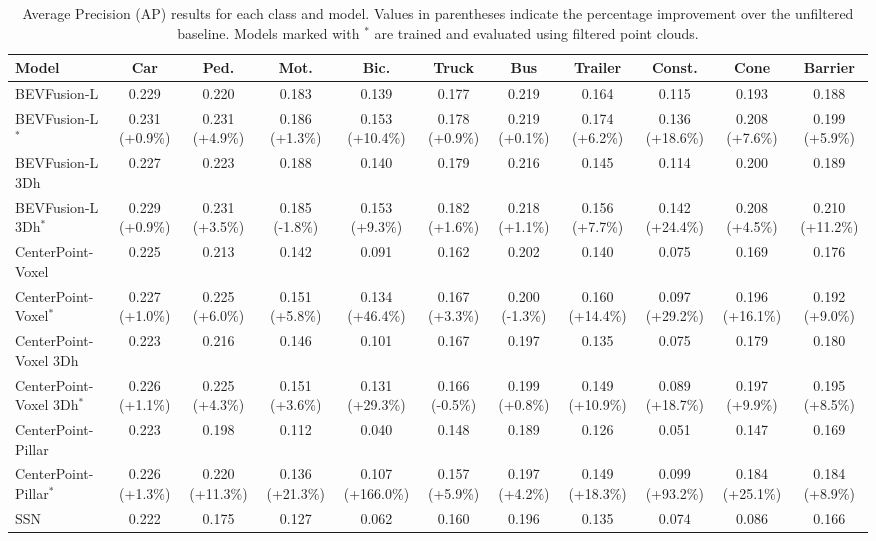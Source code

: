 
\begin{table}[htpb]
    \caption{Average Precision (AP) results for each class and model. Values in parentheses indicate the percentage improvement over the unfiltered baseline. Models marked with $^*$ are trained and evaluated using filtered point clouds.}
    \centering
    \begin{tabular}{lcccccccccc}
    \midrule
    Model & Car & Ped. & Mot. & Bic. & Truck & Bus & Trailer & Const. & Cone & Barrier \\
    \midrule
    BEVFusion-L & 0.229 & 0.220 & 0.183 & 0.139 & 0.177 & 0.219 & 0.164 & 0.115 & 0.193 & 0.188 \\
    BEVFusion-L$^*$ & 0.231 (+0.9\%) & 0.231 (+4.9\%) & 0.186 (+1.3\%) & 0.153 (+10.4\%) & 0.178 (+0.9\%) & 0.219 (+0.1\%) & 0.174 (+6.2\%) & 0.136 (+18.6\%) & 0.208 (+7.6\%) & 0.199 (+5.9\%) \\
    \midrule
    BEVFusion-L 3Dh & 0.227 & 0.223 & 0.188 & 0.140 & 0.179 & 0.216 & 0.145 & 0.114 & 0.200 & 0.189 \\
    BEVFusion-L 3Dh$^*$ & 0.229 (+0.9\%) & 0.231 (+3.5\%) & 0.185 (-1.8\%) & 0.153 (+9.3\%) & 0.182 (+1.6\%) & 0.218 (+1.1\%) & 0.156 (+7.7\%) & 0.142 (+24.4\%) & 0.208 (+4.5\%) & 0.210 (+11.2\%) \\
    \midrule
    CenterPoint-Voxel & 0.225 & 0.213 & 0.142 & 0.091 & 0.162 & 0.202 & 0.140 & 0.075 & 0.169 & 0.176 \\
    CenterPoint-Voxel$^*$ & 0.227 (+1.0\%) & 0.225 (+6.0\%) & 0.151 (+5.8\%) & 0.134 (+46.4\%) & 0.167 (+3.3\%) & 0.200 (-1.3\%) & 0.160 (+14.4\%) & 0.097 (+29.2\%) & 0.196 (+16.1\%) & 0.192 (+9.0\%) \\
    \midrule
    CenterPoint-Voxel 3Dh & 0.223 & 0.216 & 0.146 & 0.101 & 0.167 & 0.197 & 0.135 & 0.075 & 0.179 & 0.180 \\
    CenterPoint-Voxel 3Dh$^*$ & 0.226 (+1.1\%) & 0.225 (+4.3\%) & 0.151 (+3.6\%) & 0.131 (+29.3\%) & 0.166 (-0.5\%) & 0.199 (+0.8\%) & 0.149 (+10.9\%) & 0.089 (+18.7\%) & 0.197 (+9.9\%) & 0.195 (+8.5\%) \\
    \midrule
    CenterPoint-Pillar & 0.223 & 0.198 & 0.112 & 0.040 & 0.148 & 0.189 & 0.126 & 0.051 & 0.147 & 0.169 \\
    CenterPoint-Pillar$^*$ & 0.226 (+1.3\%) & 0.220 (+11.3\%) & 0.136 (+21.3\%) & 0.107 (+166.0\%) & 0.157 (+5.9\%) & 0.197 (+4.2\%) & 0.149 (+18.3\%) & 0.099 (+93.2\%) & 0.184 (+25.1\%) & 0.184 (+8.9\%) \\
    \midrule
    SSN & 0.222 & 0.175 & 0.127 & 0.062 & 0.160 & 0.196 & 0.135 & 0.074 & 0.086 & 0.166 \\

\end{tabular}
\end{table}
